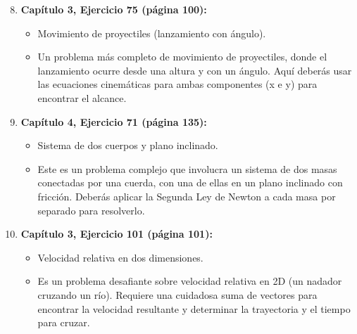 \documentclass[12pt]{article}
\begin{document}
\begin{enumerate}
\setcounter{enumi}{7}
    \item \textbf{Capítulo 3, Ejercicio 75 (página 100):}
    \begin{itemize}
        \item[\textbf{Tema:}] Movimiento de proyectiles (lanzamiento con ángulo).
        \item[\textbf{Descripción:}] Un problema más completo de movimiento de proyectiles, donde el lanzamiento ocurre desde una altura y con un ángulo. Aquí deberás usar las ecuaciones cinemáticas para ambas componentes (x e y) para encontrar el alcance.
    \end{itemize}

    \item \textbf{Capítulo 4, Ejercicio 71 (página 135):}
    \begin{itemize}
        \item[\textbf{Tema:}] Sistema de dos cuerpos y plano inclinado.
        \item[\textbf{Descripción:}] Este es un problema complejo que involucra un sistema de dos masas conectadas por una cuerda, con una de ellas en un plano inclinado con fricción. Deberás aplicar la Segunda Ley de Newton a cada masa por separado para resolverlo.
    \end{itemize}

    \item \textbf{Capítulo 3, Ejercicio 101 (página 101):}
    \begin{itemize}
        \item[\textbf{Tema:}] Velocidad relativa en dos dimensiones.
        \item[\textbf{Descripción:}] Es un problema desafiante sobre velocidad relativa en 2D (un nadador cruzando un río). Requiere una cuidadosa suma de vectores para encontrar la velocidad resultante y determinar la trayectoria y el tiempo para cruzar.
    \end{itemize}
\end{enumerate}
\end{document}

